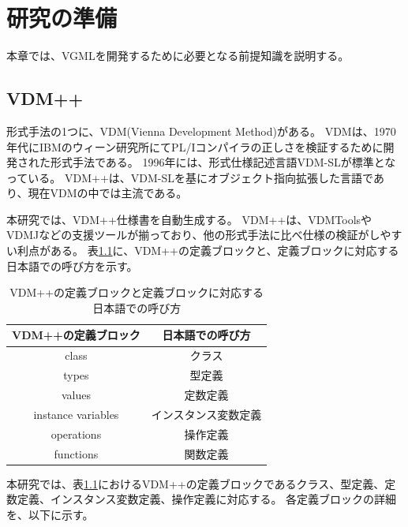 \chapter{研究の準備}
\label{cha:Preparation}

本章では、VGMLを開発するために必要となる前提知識を説明する。

\section{VDM++}
\label{sec:vdm}

形式手法の1つに、VDM(Vienna Development Method)がある\cite{vdm}。
VDMは、1970年代にIBMのウィーン研究所にてPL/Iコンパイラの正しさを検証するために開発された形式手法である。
1996年には、形式仕様記述言語VDM-SLが標準となっている\cite{vdm}。
VDM++は、VDM-SLを基にオブジェクト指向拡張した言語であり、現在VDMの中では主流である。

本研究では、VDM++仕様書を自動生成する。
VDM++は、VDMTools\cite{Tools}やVDMJ\cite{VJ}などの支援ツールが揃っており、他の形式手法に比べ仕様の検証がしやすい利点がある。
表\ref{table:vdm_block}に、VDM++の定義ブロックと、定義ブロックに対応する日本語での呼び方を示す。

\begin{table}[t]
    \begin{center}      
        \caption{VDM++の定義ブロックと定義ブロックに対応する日本語での呼び方}\label{table:vdm_block}
        \begin{tabular}{c|c}
        VDM++の定義ブロック  & 日本語での呼び方　\\ \hline \hline
        class & クラス \\ \hline
        types	 & 型定義 \\ \hline
        values  & 定数定義 \\ \hline
        instance variables & インスタンス変数定義 \\ \hline
        operations & 操作定義 \\ \hline 
        functions  & 関数定義 \\ \hline 
        \end{tabular}
    \end{center}
\end{table}

本研究では、表\ref{table:vdm_block}におけるVDM++の定義ブロックであるクラス、型定義、定数定義、インスタンス変数定義、操作定義に対応する。
各定義ブロックの詳細を、以下に示す。

